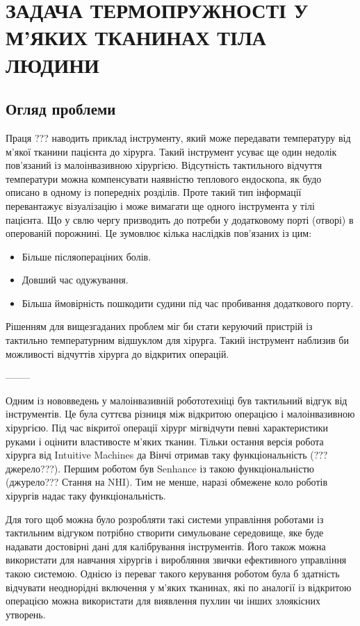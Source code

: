 \chapter{ЗАДАЧА ТЕРМОПРУЖНОСТІ У М'ЯКИХ ТКАНИНАХ ТІЛА ЛЮДИНИ}

\nocite{bahvalov-et-al,benerdge-et-al} 

\section{Огляд проблеми}

Праця \cite{lung-tumor-thermal-conductivity} ??? наводить приклад інструменту, який може передавати температуру від 
м'якої тканини пацієнта до хірурга. Такий інструмент усуває ще один недолік пов'язаний із малоінвазивною хірургією. 
Відсутність тактильного відчуття температури можна компенсувати наявністю теплового ендоскопа, як будо описано в одному 
із попередніх розділів. Проте такий тип інформації перевантажує візуалізацію і може вимагати ще одного інструмента у 
тілі пацієнта. Що у свлю чергу призводить до потреби у додатковому порті (отворі) в оперованій порожнині. Це зумовлює
кілька наслідків пов'язаних із цим:
\begin{itemize}
    \item Більше післяопераціних болів.
    \item Довший час одужування.
    \item Більша ймовірність пошкодити судини під час пробивання додаткового порту.
\end{itemize}

\noindent Рішенням для вищезгаданих проблем міг би стати керуючий пристрій із тактильно температурним відшуклом для 
хірурга. Такий інструмент наблизив би можливості відчуттів хірурга до відкритих операцій.

--------

Одним із нововведень у малоінвазивній робототехніці був тактильний відгук від інструментів. Це була суттєва різниця між
відкритою операцією і малоінвазивною хірургією. Під час вікритої операції хірург міг відчути певні
характеристики руками і оцінити властивосте м'яких тканин. Тільки остання версія робота хірурга від Intuitive Machines
да Вінчі отримав таку функціональність (???джерело???). Першим роботом був Senhance із такою функціональністю
(джурело??? Стання на NHI). Тим не менше, наразі обмежене коло роботів хірургів надає таку функціональність.

Для того щоб можна було розробляти такі системи управління роботами із тактильним відгуком потрібно створити симульоване 
середовище, яке буде надавати достовірні дані для калібрування інструментів. Його також можна використати для навчання
хірургів і виробляння звички ефективного управління такою системою. Однією із переваг такого керування роботом була б 
здатність відчувати неоднорідні включення у м'яких тканинах, які по аналогії із відкритою операцією можна використати 
для виявлення пухлин чи інших злоякісних утворень.

